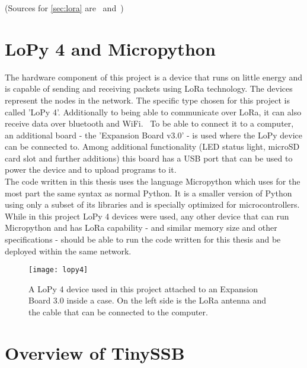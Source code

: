 (Sources for \cref{sec:lora} are~\cite{10.1007/978-3-030-01168-0_11} and~\cite{10.1145/3293534})

\section{LoPy 4 and Micropython}
The hardware component of this project is a device that runs on little energy and is capable of sending and receiving packets using LoRa technology. The devices represent the nodes in the network. The specific type chosen for this project is called 'LoPy 4'. Additionally to being able to communicate over LoRa, it can also receive data over bluetooth and WiFi.~\cite{LoPy} To be able to connect it to a computer, an additional board - the 'Expansion Board v3.0' - is used where the LoPy device can be connected to. Among additional functionality (LED status light, microSD card slot and further additions) this board has a USB port that can be used to power the device and to upload programs to it.~\cite{ExpansionBoard} \\
The code written in this thesis uses the language Micropython which uses for the most part the same syntax as normal Python. It is a smaller version of Python using only a subset of its libraries and is specially optimized for microcontrollers. \cite{Micropython} \\
While in this project LoPy 4 devices were used, any other device that can run Micropython and has LoRa capability - and similar memory size and other specifications - should be able to run the code written for this thesis and be deployed within the same network.
\begin{figure}
\centering
\texttt{[image: lopy4]}
\caption{A LoPy 4 device used in this project attached to an Expansion Board 3.0 inside a case. On the left side is the LoRa antenna and the cable that can be connected to the computer.}
\label{fig:lopy4}
\end{figure}

\newpage

\section{Overview of TinySSB}
\label{sec:tiny}
